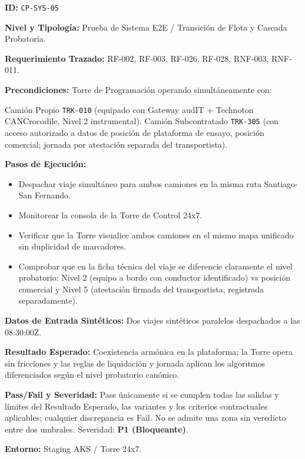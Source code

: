\par\noindent\textbf{ID:} \texttt{CP-\allowbreak{}SYS-\allowbreak{}05}\par
\par\noindent\textbf{Nivel y Tipología:} Prueba de Sistema E2E / Transición de Flota y Cascada Probatoria.\par
\par\noindent\textbf{Requerimiento Trazado:} RF-002, RF-003, RF-026, RF-028, RNF-003, RNF-011.\par
\par\noindent\textbf{Precondiciones:} Torre de Programación operando simultáneamente con:\par
Camión Propio \texttt{TRK-\allowbreak{}010} (equipado con Gateway audIT + Technoton CANCrocodile, Nivel 2 instrumental).
Camión Subcontratado \texttt{TRK-\allowbreak{}305} (con acceso autorizado a datos de posición de plataforma de ensayo, posición comercial; jornada por atestación separada del transportista).
\par\noindent\textbf{Pasos de Ejecución:}\par
\begin{itemize}
\item Despachar viaje simultáneo para ambos camiones en la misma ruta Santiago-San Fernando.
\item Monitorear la consola de la Torre de Control 24x7.
\item Verificar que la Torre visualice ambos camiones en el mismo mapa unificado sin duplicidad de marcadores.
\item Comprobar que en la ficha técnica del viaje se diferencie claramente el nivel probatorio: Nivel 2 (equipo a bordo con conductor identificado) vs posición comercial y Nivel 5 (atestación firmada del transportista, registrada separadamente).
\end{itemize}

\par\noindent\textbf{Datos de Entrada Sintéticos:} Dos viajes sintéticos paralelos despachados a las 08:30:00Z.\par
\par\noindent\textbf{Resultado Esperado:} Coexistencia armónica en la plataforma; la Torre opera sin fricciones y las reglas de liquidación y jornada aplican los algoritmos diferenciados según el nivel probatorio canónico.\par
\par\noindent\textbf{Pass/Fail y Severidad:} Pass únicamente si se cumplen todas las salidas y límites del Resultado Esperado, las variantes y los criterios contractuales aplicables; cualquier discrepancia es Fail. No se admite una zona sin veredicto entre dos umbrales. Severidad: \textbf{P1 (Bloqueante)}.\par
\par\noindent\textbf{Entorno:} Staging AKS / Torre 24x7.\par

